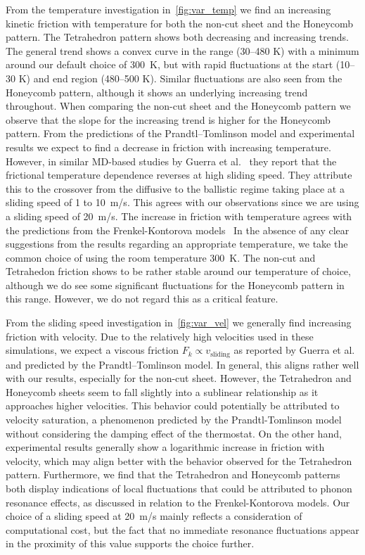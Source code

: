 From the temperature investigation in~\cref{fig:var_temp} we find an increasing
kinetic friction with temperature for both the non-cut sheet and the Honeycomb
pattern. The Tetrahedron pattern shows both decreasing and increasing trends.
The general trend shows a convex curve in the range (30--480 K) with a minimum
around our default choice of \SI{300}{K}, but with rapid fluctuations at the
start (10--30 K) and end region (480--500 K). Similar fluctuations are also seen
from the Honeycomb pattern, although it shows an underlying increasing trend
throughout. When comparing the non-cut sheet and the Honeycomb pattern we
observe that the slope for the increasing trend is higher for the Honeycomb
pattern. From the predictions of the Prandtl–Tomlinson model and experimental results we expect to find a decrease in friction with increasing temperature. However, in similar \acrshort{MD}-based studies by Guerra et al.~\cite{Guerra_2010} they report that the frictional temperature dependence reverses at high sliding speed. They attribute this to the crossover from the diffusive to the ballistic regime taking place at a sliding speed of 1 to \SI{10}{m/s}. This agrees with our observations since we are using a sliding speed of \SI{20}{m/s}. The increase in friction with temperature agrees with the predictions from the Frenkel-Kontorova models~\cite{FK2D}
In the absence of any clear suggestions from the results regarding an appropriate temperature, we take the common choice of using the room temperature \SI{300}{K}. The non-cut and Tetrahedon friction shows to be rather
stable around our temperature of choice, although we do see some significant fluctuations for the Honeycomb pattern in this range. However, we do not regard this as a critical feature.

From the sliding speed investigation in~\cref{fig:var_vel} we generally find
increasing friction with velocity. Due to the relatively high velocities used in
these simulations, we expect a viscous friction $F_k \propto v_{\text{sliding}}$
as reported by Guerra et al.~\cite{Guerra_2010} and predicted by the
Prandtl–Tomlinson model. In general, this aligns rather well with our results,
especially for the non-cut sheet. However, the Tetrahedron and Honeycomb sheets
seem to fall slightly into a sublinear relationship as it approaches higher
velocities. This behavior could potentially be attributed to velocity
saturation, a phenomenon predicted by the Prandtl-Tomlinson model without
considering the damping effect of the thermostat. On the other hand,
experimental results generally show a logarithmic increase in friction with
velocity, which may align better with the behavior observed for the Tetrahedron
pattern. Furthermore, we find that the Tetrahedron and Honeycomb patterns both
display indications of local fluctuations that could be attributed
to phonon resonance effects, as discussed in relation to the Frenkel-Kontorova
models. Our choice of a sliding speed at \SI{20}{m/s} mainly reflects a
consideration of computational cost, but the fact that no immediate resonance
fluctuations appear in the proximity of this value supports the choice further.  

